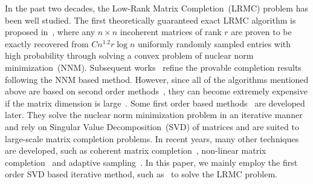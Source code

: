In the past two decades, the Low-Rank Matrix Completion~(LRMC) problem has been well studied. The first theoretically guaranteed exact LRMC algorithm is proposed in~\cite{candes2009exact}, where any $n \times n$ incoherent matrices of rank $r$ are proven to be exactly recovered from $C n^{1.2}r\log n$ uniformly randomly sampled entries with high probability through solving a convex problem of nuclear norm minimization~(NNM). Subsequent works~\cite{candes2010power, chen2015incoherence, gross2011recovering, recht2011simpler} refine the provable completion results following the NNM based method. However, since all of the algorithms mentioned above are based on second order methods~\cite{liu2010interior}, they can become extremely expensive if the matrix dimension is large~\cite{cai2010singular}. Some first order based methods~\cite{cai2010singular, ji2009accelerated, mazumder2010spectral} are developed later. They solve the nuclear norm minimization problem in an iterative manner and rely on Singular Value Decomposition~(SVD) of matrices and are suited to large-scale matrix completion problems. In recent years, many other techniques are developed, such as coherent matrix completion~\cite{liu2017new, bhojanapalli2014universal, chen2014coherent}, non-linear matrix completion~\cite{eriksson2012high} and adaptive sampling~\cite{chen2015completing, eftekhari2018mc2}. %
In this paper, we mainly employ the first order SVD based iterative method, such as~\cite{mazumder2010spectral} to solve the LRMC problem.
